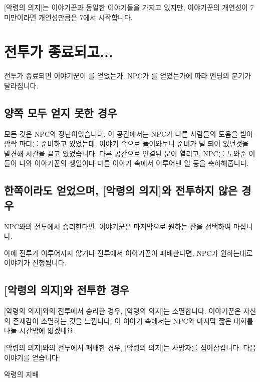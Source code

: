 \documentclass{report}
\begin{document}
			[악령의 의지]는 이야기꾼과 동일한 이야기들을 가지고 있지만, 이야기꾼의 개연성이 7 미만이라면 개연성만큼은 7에서 시작합니다.
	
	\section{전투가 종료되고...}
	전투가 종료되면 이야기꾼이 를 얻었는가, NPC가 를 얻었는가에 따라 엔딩의 분기가 달라집니다.
	
		\subsection{양쪽 모두 얻지 못한 경우}
			모든 것은 NPC의 장난이었습니다. 이 공간에서는 NPC가 다른 사람들의 도움을 받아 깜짝 파티를 준비하고 있었는데, 이야기 속으로 들어와보니 준비가 덜 되어 있던것을 발견해 시간을 끌고 있었습니다. 다른 공간으로 연결된 문이 열리고, NPC를 도와준 이들이 나와 이야기꾼의 생일이나 다른 이야기 속에서 이루어낸 일 등을 축하해줍니다.
			
		\subsection{한쪽이라도 얻었으며, [악령의 의지]와 전투하지 않은 경우}
			NPC와의 전투에서 승리한다면, 이야기꾼은 마지막으로 원하는 잔을 선택하여 마십니다.
			
			아예 전투가 이루어지지 않거나 전투에서 이야기꾼이 패배한다면, NPC가 원하는대로 이야기가 진행됩니다.
		
		\subsection{[악령의 의지]와 전투한 경우}
			[악령의 의지]와의 전투에서 승리한 경우, [악령의 의지]는 소멸합니다. 이야기꾼은 자신의 존재감이 소멸하는 것을 느낍니다. 이 이야기 속에서는 NPC와 마지막 짧은 대화를 나눌 시간밖에 없겠네요.
			
			[악령의 의지]와의 전투에서 패배한 경우, [악령의 의지]는 사망자를 집어삼킵니다. 다음 이야기를 얻습니다:
			\begin{lite}{악령의 지배}
			\end{lite}
			
\end{document}
